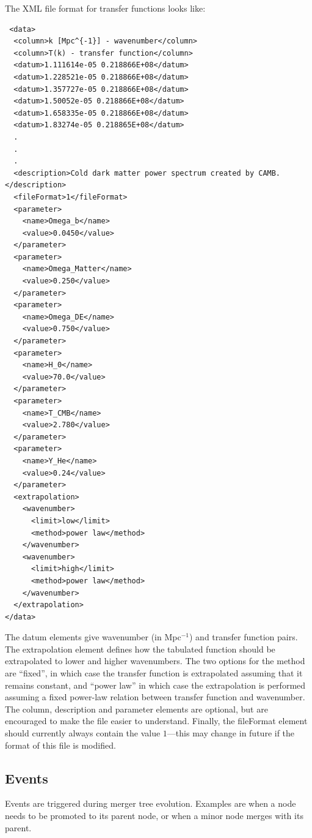 The XML file format for transfer functions looks like:
\begin{verbatim}
 <data>
  <column>k [Mpc^{-1}] - wavenumber</column>
  <column>T(k) - transfer function</column>
  <datum>1.111614e-05 0.218866E+08</datum>
  <datum>1.228521e-05 0.218866E+08</datum>
  <datum>1.357727e-05 0.218866E+08</datum>
  <datum>1.50052e-05 0.218866E+08</datum>
  <datum>1.658335e-05 0.218866E+08</datum>
  <datum>1.83274e-05 0.218865E+08</datum>
  .
  .
  .
  <description>Cold dark matter power spectrum created by CAMB.</description>
  <fileFormat>1</fileFormat>
  <parameter>
    <name>Omega_b</name>
    <value>0.0450</value>
  </parameter>
  <parameter>
    <name>Omega_Matter</name>
    <value>0.250</value>
  </parameter>
  <parameter>
    <name>Omega_DE</name>
    <value>0.750</value>
  </parameter>
  <parameter>
    <name>H_0</name>
    <value>70.0</value>
  </parameter>
  <parameter>
    <name>T_CMB</name>
    <value>2.780</value>
  </parameter>
  <parameter>
    <name>Y_He</name>
    <value>0.24</value>
  </parameter>
  <extrapolation>
    <wavenumber>
      <limit>low</limit>
      <method>power law</method>
    </wavenumber>
    <wavenumber>
      <limit>high</limit>
      <method>power law</method>
    </wavenumber>
  </extrapolation>
</data>
\end{verbatim}
The {\normalfont \ttfamily datum} elements give wavenumber (in Mpc$^{-1}$) and transfer function pairs. The {\normalfont \ttfamily extrapolation} element defines how the tabulated function should be extrapolated to lower and higher wavenumbers. The two options for the {\normalfont \ttfamily method} are ``fixed'', in which case the transfer function is extrapolated assuming that it remains constant, and ``power law'' in which case the extrapolation is performed assuming a fixed power-law relation between transfer function and wavenumber. The {\normalfont \ttfamily column}, {\normalfont \ttfamily description} and {\normalfont \ttfamily parameter} elements are optional, but are encouraged to make the file easier to understand. Finally, the {\normalfont \ttfamily fileFormat} element should currently always contain the value $1$---this may change in future if the format of this file is modified.

\subsection{Events}

Events are triggered during merger tree evolution. Examples are when a node needs to be promoted to its parent node, or when a minor node merges with its parent.

